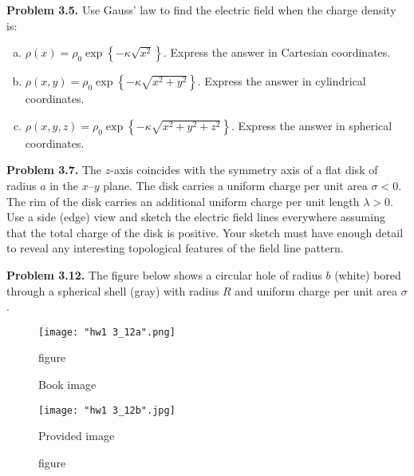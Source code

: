 \documentclass{article}
\begin{document}
\hrulefill

\textbf{Problem 3.5.} Use Gauss' law to find the electric field when the charge density is:

\begin{enumerate}[(a)]
\item $\rho (x) = \rho _0 \exp\left\{-\kappa \sqrt{x^2}\right\}$. Express the answer in Cartesian coordinates.
\item $\rho (x,y) = \rho _0 \exp\left\{-\kappa \sqrt{x^2 + y^2}\right\}$. Express the answer in cylindrical coordinates.
\item $\rho (x,y,z) = \rho _0 \exp\left\{-\kappa \sqrt{x^2 + y^2 + z^2}\right\}$. Express the answer in spherical coordinates.
\end{enumerate}

\hrulefill

\textbf{Problem 3.7.} The $z$-axis coincides with the symmetry axis of a flat disk of radius $a$ in the $x$--$y$ plane. The disk carries a uniform charge per unit area $\sigma < 0$. The rim of the disk carries an additional uniform charge per unit length $\lambda > 0$. Use a side (edge) view and sketch the electric field lines everywhere assuming that the total charge of the disk is positive. Your sketch must have enough detail to reveal any interesting topological features of the field line pattern.

\hrulefill

\textbf{Problem 3.12.} The figure below shows a circular hole of radius $b$ (white) bored through a spherical shell (gray) with radius $R$ and uniform charge per unit area $\sigma$.

\begin{figure}[H]
\centering
\begin{minipage}{.5\textwidth}
 	\centering
	\texttt{[image: "hw1 3\_12a".png]}
	\caption{figure}{Book image}
\end{minipage}%
\begin{minipage}{.5\textwidth}
 	\centering
	\texttt{[image: "hw1 3\_12b".jpg]}
	\caption{figure}{Provided image}
\end{minipage}
\end{figure}
\end{document}
